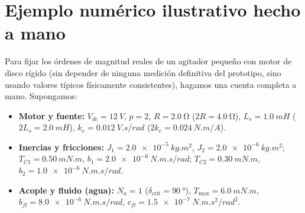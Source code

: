 \documentclass[11pt,a4paper,oneside]{book}
\begin{document}
\section{Ejemplo numérico ilustrativo hecho a mano}\label{sec:ejemplo_numerico}

Para fijar los órdenes de magnitud reales de un agitador pequeño con motor de
disco rígido (sin depender de ninguna medición definitiva del prototipo, sino
usando valores típicos físicamente consistentes), hagamos una cuenta completa a
mano. Supongamos:
\begin{itemize}
  \item \textbf{Motor y fuente:} $V_{dc} = \SI{12}{V}$, $p = 2$,
        $R = \SI{2,0}{\ohm}$ ($2R = \SI{4,0}{\ohm}$),
        $L_s = \SI{1,0}{mH}$ ($2L_s = \SI{2,0}{mH}$),
        $k_e = \SI{0,012}{V.s/rad}$ ($2k_e = \SI{0,024}{N.m/A}$).
  \item \textbf{Inercias y fricciones:}
        $J_1 = \SI{2,0e-5}{kg.m^2}$, $J_2 = \SI{2,0e-6}{kg.m^2}$;
        $T_{C1} = \SI{0,50}{mN.m}$, $b_1 = \SI{2,0e-6}{N.m.s/rad}$;
        $T_{C2} = \SI{0,30}{mN.m}$, $b_2 = \SI{1,0e-6}{N.m.s/rad}$.
  \item \textbf{Acople y fluido (agua):}
        $N_a = 1$ ($\delta_{\text{crit}} = \SI{90}{\degree}$),
        $T_{\max} = \SI{6,0}{mN.m}$,
        $b_{fl} = \SI{8,0e-6}{N.m.s/rad}$,
        $c_{fl} = \SI{1,5e-7}{N.m.s^2/rad^2}$.
\end{itemize}
\end{document}
